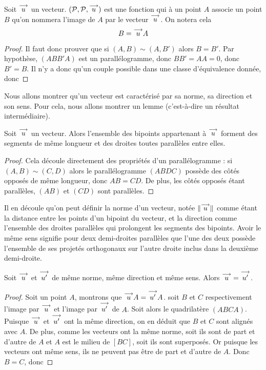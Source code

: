 \begin{defi}
    Soit $\overset{\longrightarrow}{u}$ un vecteur. $(\mathcal P,\mathcal P, \overset{\longrightarrow}{u})$ est une fonction qui à un point $A$ associe un point $B$ qu'on nommera l'image de $A$ par le vecteur $\overset{\longrightarrow}{u}$. On notera cela $$B=\overset{\longrightarrow}{u} A$$
\end{defi}
\begin{proof}
    Il faut donc prouver que si $(A,B)\sim (A,B')$ alors $B=B'$. Par hypothèse, $(ABB'A)$ est un parallélogramme, donc $BB'=AA=0$, donc $B'=B$. Il n'y a donc qu'un couple possible dans une classe d'équivalence donnée, donc 
\end{proof}

Nous allons montrer qu'un vecteur est caractérisé par sa norme, sa direction et son sens. Pour cela, nous allons montrer un lemme (c'est-à-dire un résultat intermédiaire).

\begin{lem}
    Soit $\overset{\longrightarrow}{u}$ un vecteur. Alors l'ensemble des bipoints appartenant à $\overset{\longrightarrow}{u}$ forment des segments de même longueur et des droites toutes parallèles entre elles.
\end{lem}
\begin{proof}
    Cela découle directement des propriétés d'un parallélogramme : si $(A,B)\sim (C,D)$ alors le parallélogramme $(ABDC)$ possède des côtés opposés de même longueur, donc $AB=CD$. De plus, les côtés opposés étant parallèles, $(AB)$ et $(CD)$ sont parallèles.
\end{proof}

Il en découle qu'on peut définir la norme d'un vecteur, notée $\|\overset{\longrightarrow}{u}\|$ comme étant la distance entre les points d'un bipoint du vecteur, et la direction comme l'ensemble des droites parallèles qui prolongent les segments des bipoints. Avoir le même sens signifie pour deux demi-droites parallèles que l'une des deux possède l'ensemble de ses projetés orthogonaux sur l'autre droite inclus dans la deuxième demi-droite.

\begin{prop}
    Soit $\overset{\longrightarrow}{u}$ et $\overset{\longrightarrow}{u'}$ de même norme, même direction et même sens. Alors $\overset{\longrightarrow}{u} = \overset{\longrightarrow}{u'}$.
\end{prop}
\begin{proof}
    Soit un point $A$, montrons que $\overset{\longrightarrow}{u} A = \overset{\longrightarrow}{u'}A$. soit $B$ et $C$ respectivement l'image par $\overset{\longrightarrow}{u}$ et l'image par $\overset{\longrightarrow}{u'}$ de $A$. Soit alors le quadrilatère $(ABCA)$. Puisque $\overset{\longrightarrow}{u} $ et $\overset{\longrightarrow}{u'}$ ont la même direction, on en déduit que $B$ et $C$ sont alignés avec $A$. De plus, comme les vecteurs ont la même norme, soit ils sont de part et d'autre de $A$ et $A$ est le milieu de $[BC]$, soit ils sont superposés. Or puisque les vecteurs ont même sens, ils ne peuvent pas être de part et d'autre de $A$. Donc $B=C$, donc 
\end{proof}

